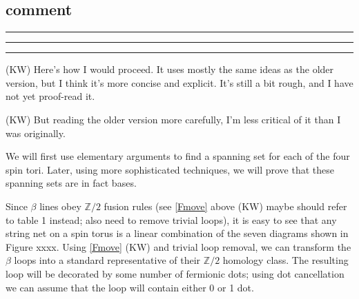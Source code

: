 \documentclass[12pt,a4paper]{article}
\newcommand{\zz}{\mathbb{Z}}
\newcommand{\kw}[1]{{\color{kwcolor}\footnotesize{(KW) #1}}}
\newcommand{\kwsep}{\bigskip\hrule\medskip\hrule\medskip\hrule\bigskip}
\begin{document}
 
\subsection{comment}
\kwsep

\kw{Here's how I would proceed.
It uses mostly the same ideas as the older version, but I think it's more concise and explicit.
It's still a bit rough, and I have not yet proof-read it.}

\kw{But reading the older version more carefully, I'm less critical of it than I was originally.}

We will first use elementary arguments to find a spanning set for each of the four spin tori.
Later, using more sophisticated techniques, we will prove that these spanning sets are in fact bases.

Since $\beta$ lines obey $\zz/2$ fusion rules (see \eqref{Fmove} above \kw{maybe should refer to table 1 instead;
also need to remove trivial loops}), it is easy to see that any string net on a spin torus
is a linear combination of the seven diagrams shown in Figure xxxx.
Using \eqref{Fmove} \kw{and trivial loop removal}, we can transform the $\beta$ loops into a standard representative of their
$\zz/2$ homology class.
The resulting loop will be decorated by some number of fermionic dots; using dot cancellation we can assume that the
loop will contain either 0 or 1 dot.
\end{document}

